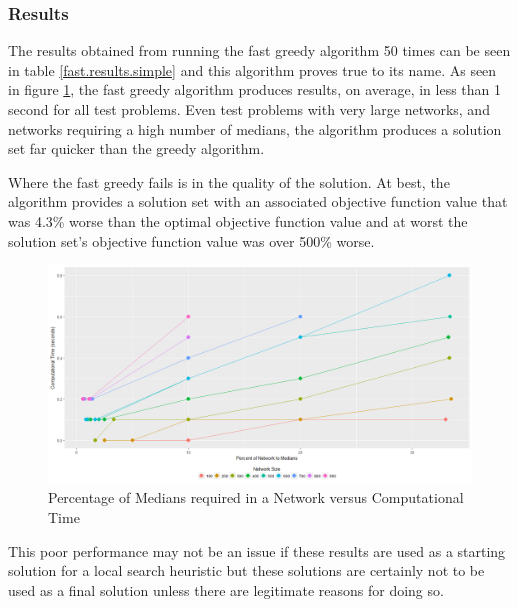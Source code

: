 \documentclass[11pt]{article}
\begin{document}
	
	\subsubsection{Results}
	The results obtained from running the fast greedy algorithm 50 times can be seen in table \ref{fast.results.simple} and this algorithm proves true to its name.  As seen in figure \ref{percentmedvstime_fast}, the fast greedy algorithm produces results, on average, in less than 1 second for all test problems.  Even test problems with very large networks, and networks requiring a high number of medians, the algorithm produces a solution set far quicker than the greedy algorithm.
	
	Where the fast greedy fails is in the quality of the solution.  At best, the algorithm provides a solution set with an associated objective function value that was 4.3\% worse than the optimal objective function value and at worst the solution set's objective function value was over 500\% worse.
	
	\begin{figure}[H]
		\begin{center}
			\includegraphics[width=14cm]{percentmedvstime_fast.png}
			\caption{Percentage of Medians required in a Network versus Computational Time}
			\label{percentmedvstime_fast}
		\end{center}
	\end{figure}
	
	This poor performance may not be an issue if these results are used as a starting solution for a local search heuristic but these solutions are certainly not to be used as a final solution unless there are legitimate reasons for doing so.
	
\end{document}
